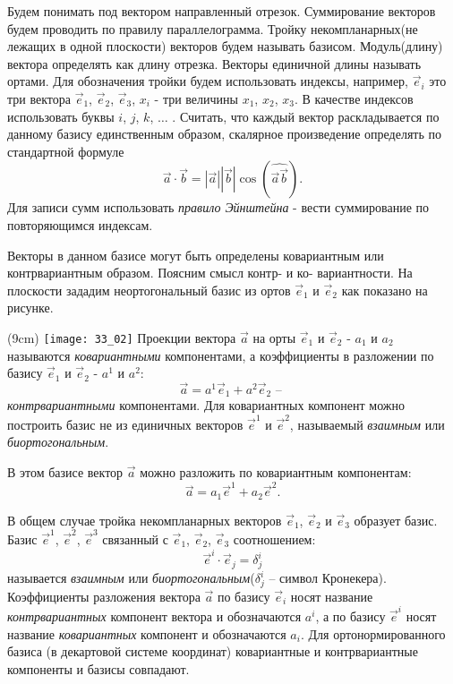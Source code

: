 Будем понимать под вектором направленный отрезок. Суммирование векторов будем
проводить по правилу параллелограмма. Тройку некомпланарных(не лежащих в одной
плоскости) векторов будем называть базисом. Модуль(длину) вектора определять
как длину отрезка. Векторы единичной длины называть ортами. Для обозначения
тройки будем использовать индексы, например, \( \vec{e}_{i} \) это три вектора
\( \vec{e}_{1} \), \( \vec{e}_{2} \), \( \vec{e}_{3} \), \( x_i \) - три
величины \( x_1 \), \( x_2 \), \( x_3 \). В качестве индексов использовать
буквы \( i \), \( j \), \( k \), \( \ldots \) . Считать, что каждый вектор
раскладывается по данному базису единственным образом, скалярное произведение
определять по стандартной формуле
\[
    \vec{a}\cdot\vec{b} = |\vec{a}||\vec{b}|\cos (\widehat{\vec{a}\vec{b}}).
\]
Для записи сумм использовать \emph{правило Эйнштейна} - вести суммирование по
повторяющимся индексам.

Векторы в данном базисе могут быть определены ковариантным или контрвариантным
образом. Поясним смысл контр- и ко- вариантности. На плоскости зададим
неортогональный базис из ортов \( \vec{e}_{1} \) и \( \vec{e}_{2} \) как
показано на рисунке.

\sidefig(9cm)
{\texttt{[image: 33\_02]}}{
Проекции вектора \( \vec{a} \) на орты \( \vec{e}_{1} \) и \( \vec{e}_{2} \) -
\( a_1 \)  и \( a_2 \) называются \emph{ковариантными} компонентами, а
коэффициенты в разложении по базису \( \vec{e}_{1} \) и \( \vec{e}_{2} \) -
\( a^1 \)  и \( a^2 \):
\[
    \vec{a} = a^1 \vec{e}_{1} + a^2 \vec{e}_{2} \text{ -- }
\]
\emph{контрвариантными} компонентами. Для ковариантных компонент можно
построить базис не из единичных векторов \( \vec{e}^{1} \) и \( \vec{e}^{2} \),
называемый \emph{взаимным} или \emph{биортогональным}.}

В этом базисе вектор \( \vec{a} \) можно разложить по ковариантным компонентам:
\[
    \vec{a} = a_1 \vec{e}^{1} + a_2 \vec{e}^{2}.
\]
    
В общем случае тройка некомпланарных векторов \( \vec{e}_{1} \),
\( \vec{e}_{2} \) и \( \vec{e}_{3} \) образует базис. Базис \( \vec{e}^{1} \),
\( \vec{e}^{2} \), \( \vec{e}^{3} \) связанный с \( \vec{e}_{1} \),
\( \vec{e}_{2} \), \( \vec{e}_{3} \) соотношением:
\[
    \vec{e}^{i}\cdot\vec{e}_{j} = \delta^i_{j}
\]
называется \emph{взаимным} или \emph{биортогональным}(\( \delta^i_{j} \) --
символ Кронекера).  Коэффициенты разложения вектора \( \vec{a} \) по базису
\( \vec{e}_{i} \) носят название \emph{контрвариантных} компонент вектора и
обозначаются \( a^i \), а по базису \( \vec{e}^{i} \) носят название
\emph{ковариантных} компонент и обозначаются \( a_i \). Для ортонормированного
базиса (в декартовой системе координат) ковариантные и контрвариантные
компоненты и базисы совпадают.
    
